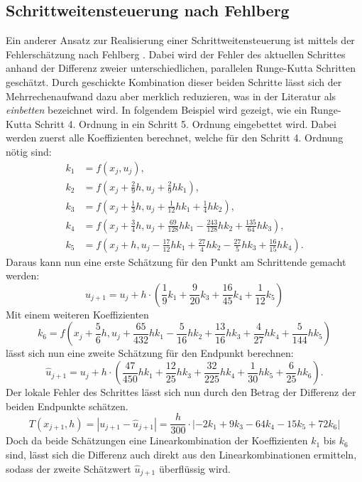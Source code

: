 \subsection{Schrittweitensteuerung nach Fehlberg
  \label{steps:subsection:fehlberg}}
Ein anderer Ansatz zur Realisierung einer Schrittweitensteuerung ist mittels der Fehlerschätzung nach Fehlberg
\cite{steps:Numerische-Mathematik}.
Dabei wird der Fehler des aktuellen Schrittes anhand der Differenz zweier unterschiedlichen, parallelen
Runge-Kutta Schritten geschätzt. Durch geschickte Kombination dieser beiden Schritte
lässt sich der Mehrrechenaufwand dazu aber merklich reduzieren, was in der Literatur als \textit{einbetten} bezeichnet wird.
In folgendem Beispiel wird gezeigt, wie ein Runge-Kutta Schritt 4. Ordnung in ein Schritt 5. Ordnung eingebettet wird.
Dabei werden zuerst alle Koeffizienten berechnet, welche für den Schritt 4. Ordnung nötig sind:
\begin{align*}
  k_1 & =f(x_j, u_j),                                                                           \\
  k_2 & =f\left(x_j + \frac{2}{9}h, u_j+\frac{2}{9}hk_1\right),                                            \\
  k_3 & =f\left(x_j + \frac{1}{3}h, u_j+\frac{1}{12}hk_1+\frac{1}{4}hk_2\right),                           \\
  k_4 & =f\left(x_j + \frac{3}{4}h, u_j+\frac{69}{128}hk_1-\frac{243}{128}hk_2+\frac{135}{64}hk_3\right),  \\
  k_5 & =f\left(x_j + h, u_j-\frac{17}{12}hk_1+\frac{27}{4}hk_2-\frac{27}{5}hk_3+\frac{16}{15}hk_4\right).
\end{align*}
Daraus kann nun eine erste Schätzung für den Punkt am Schrittende gemacht werden:
\[
  u_{j+1} =u_j +h\cdot\left(\frac{1}{9}k_1+\frac{9}{20}k_3+\frac{16}{45}k_4+\frac{1}{12}k_5\right)
\]
Mit einem weiteren Koeffizienten
\[
  k_6 =f\left(x_j + \frac{5}{6}h, u_j+\frac{65}{432}hk_1-\frac{5}{16}hk_2+\frac{13}{16}hk_3+\frac{4}{27}hk_4+\frac{5}{144}hk_5\right)
\]
lässt sich nun eine zweite Schätzung für den Endpunkt berechnen:
\[
  \hat{u}_{j+1} =u_j+h\cdot\left(\frac{47}{450}hk_1+\frac{12}{25}hk_3+\frac{32}{225}hk_4+\frac{1}{30}hk_5+\frac{6}{25}hk_6\right).
\]
Der lokale Fehler des Schrittes lässt sich nun durch den Betrag der Differenz der beiden Endpunkte schätzen.
\[
  T(x_{j+1},h)=|u_{j+1}-\hat{u}_{j+1}|=\frac{h}{300}\cdot|-2k_1+9k_3-64k_4-15k_5+72k_6|
\]
Doch da beide Schätzungen eine Linearkombination der Koeffizienten $k_1$ bis $k_6$ sind,
lässt sich die Differenz auch direkt aus den Linearkombinationen ermitteln,
sodass der zweite Schätzwert $\hat{u}_{j+1}$ überflüssig wird.

